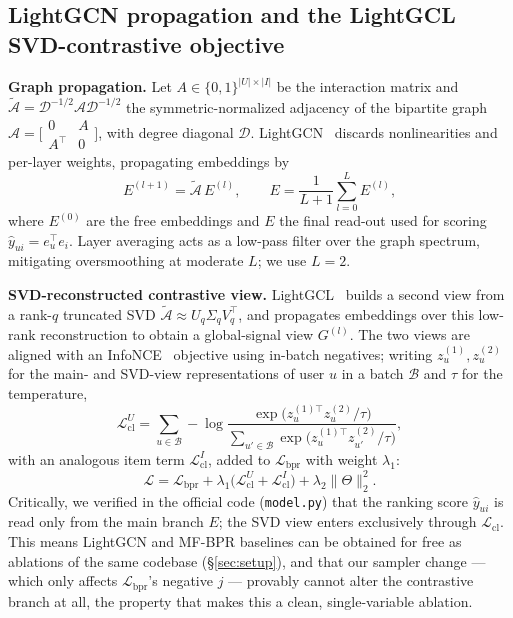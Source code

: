 \documentclass{article}
\begin{document}
\subsection{LightGCN propagation and the LightGCL SVD-contrastive objective}
\label{sec:lightgcl-formal}
\textbf{Graph propagation.} Let $A\in\{0,1\}^{|U|\times|I|}$ be the interaction
matrix and $\tilde{\mathcal{A}}=\mathcal{D}^{-1/2}\mathcal{A}\mathcal{D}^{-1/2}$
the symmetric-normalized adjacency of the bipartite graph
$\mathcal{A}=\big[\begin{smallmatrix}0&A\\A^\top&0\end{smallmatrix}\big]$, with
degree diagonal $\mathcal{D}$. LightGCN~\cite{lightgcn} discards nonlinearities
and per-layer weights, propagating embeddings by
\[
E^{(l+1)}=\tilde{\mathcal{A}}\,E^{(l)},\qquad
E=\frac{1}{L+1}\sum_{l=0}^{L}E^{(l)},
\]
where $E^{(0)}$ are the free embeddings and $E$ the final read-out used for
scoring $\hat y_{ui}=e_u^\top e_i$. Layer averaging acts as a low-pass filter over
the graph spectrum, mitigating oversmoothing at moderate $L$; we use $L=2$.

\textbf{SVD-reconstructed contrastive view.} LightGCL~\cite{lightgcl} builds a
second view from a rank-$q$ truncated SVD $\tilde{\mathcal{A}}\approx
U_q\Sigma_q V_q^{\top}$, and propagates embeddings over this low-rank
reconstruction to obtain a global-signal view $G^{(l)}$. The two views are aligned
with an InfoNCE~\cite{infonce} objective using in-batch negatives; writing
$z^{(1)}_u,z^{(2)}_u$ for the main- and SVD-view representations of user $u$ in a
batch $\mathcal{B}$ and $\tau$ for the temperature,
\[
\mathcal{L}_{\mathrm{cl}}^{U}
= \sum_{u\in\mathcal{B}} -\log
\frac{\exp\!\big(z^{(1)\top}_u z^{(2)}_u/\tau\big)}
{\sum_{u'\in\mathcal{B}}\exp\!\big(z^{(1)\top}_u z^{(2)}_{u'}/\tau\big)},
\]
with an analogous item term $\mathcal{L}_{\mathrm{cl}}^{I}$, added to
$\mathcal{L}_{\mathrm{bpr}}$ with weight $\lambda_1$:
\[
\mathcal{L}=\mathcal{L}_{\mathrm{bpr}}
+\lambda_1\big(\mathcal{L}_{\mathrm{cl}}^{U}+\mathcal{L}_{\mathrm{cl}}^{I}\big)
+\lambda_2\lVert\Theta\rVert_2^2 .
\]
Critically, we verified in the official code (\texttt{model.py}) that the ranking
score $\hat y_{ui}$ is read only from the main branch $E$; the SVD view enters
exclusively through $\mathcal{L}_{\mathrm{cl}}$. This means LightGCN and MF-BPR
baselines can be obtained for free as ablations of the same codebase
(\S\ref{sec:setup}), and that our sampler change --- which only affects
$\mathcal{L}_{\mathrm{bpr}}$'s negative $j$ --- provably cannot alter the
contrastive branch at all, the property that makes this a clean, single-variable
ablation.
\end{document}
